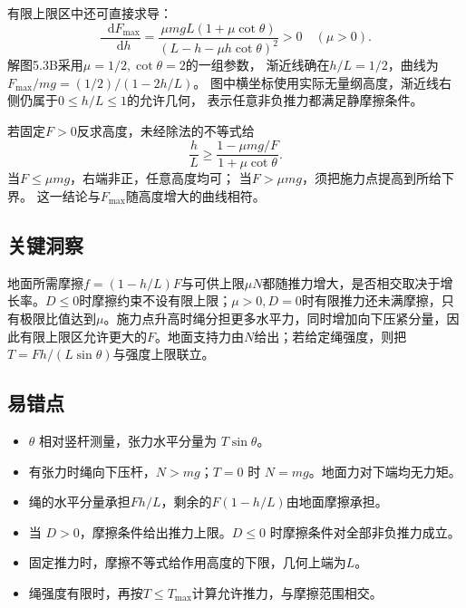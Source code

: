 \documentclass[UTF8,fontset=fandol,a4paper,11pt]{ctexart}
\newcommand{\dd}{\mathop{}\!\mathrm{d}}
\begin{document}
有限上限区中还可直接求导：
\[
\frac{\dd F_{\max}}{\dd h}
=\frac{\mu mgL(1+\mu\cot\theta)}
{(L-h-\mu h\cot\theta)^2}>0\quad(\mu>0).
\]
解图5.3B采用$\mu=1/2,\cot\theta=2$的一组参数，
渐近线确在$h/L=1/2$，曲线为$F_{\max}/mg=(1/2)/(1-2h/L)$。
图中横坐标使用实际无量纲高度，渐近线右侧仍属于$0\leq h/L\leq1$的允许几何，
表示任意非负推力都满足静摩擦条件。

若固定$F>0$反求高度，未经除法的不等式给
\[
\frac hL\geq
\frac{1-\mu mg/F}{1+\mu\cot\theta}.
\]
当$F\leq\mu mg$，右端非正，任意高度均可；
当$F>\mu mg$，须把施力点提高到所给下界。
这一结论与$F_{\max}$随高度增大的曲线相符。




\subsection*{关键洞察}

地面所需摩擦$f=(1-h/L)F$与可供上限$\mu N$都随推力增大，是否相交取决于增长率。$D\leq0$时摩擦约束不设有限上限；$\mu>0,D=0$时有限推力还未满摩擦，只有极限比值达到$\mu$。施力点升高时绳分担更多水平力，同时增加向下压紧分量，因此有限上限区允许更大的$F$。地面支持力由$N$给出；若给定绳强度，则把$T=Fh/(L\sin\theta)$与强度上限联立。



\subsection*{易错点}

\begin{itemize}\item $\theta$ 相对竖杆测量，张力水平分量为 $T\sin\theta$。\item 有张力时绳向下压杆，$N>mg$；$T=0$ 时 $N=mg$。地面力对下端均无力矩。\item 绳的水平分量承担$Fh/L$，剩余的$F(1-h/L)$由地面摩擦承担。\item 当 $D>0$，摩擦条件给出推力上限。$D\le0$ 时摩擦条件对全部非负推力成立。\item 固定推力时，摩擦不等式给作用高度的下限，几何上端为$L$。\item 绳强度有限时，再按$T\le T_{\max}$计算允许推力，与摩擦范围相交。\end{itemize}

\end{document}
